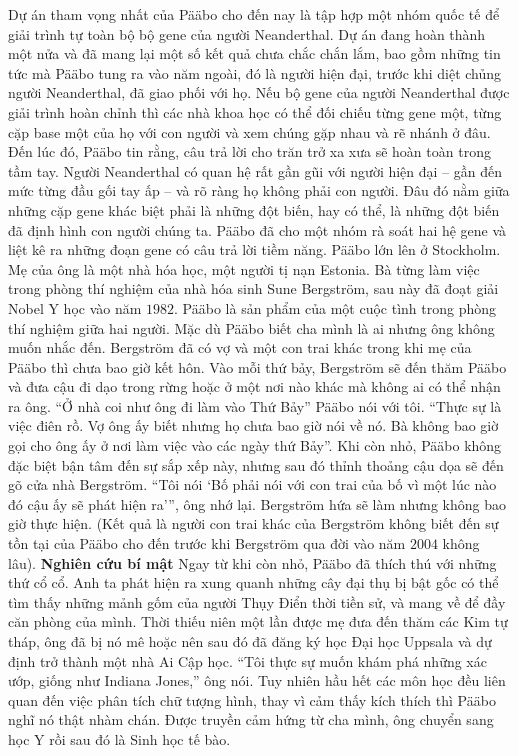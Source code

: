 \begin{multicols}{2}
	\vskip 0.1cm
	Dự án tham vọng nhất của Pääbo cho đến nay là tập hợp một nhóm quốc tế để giải trình tự toàn bộ bộ gene của người Neanderthal. Dự án đang hoàn thành một nửa và đã mang lại một số kết quả chưa chắc chắn lắm, bao gồm những tin tức mà Pääbo tung ra vào năm ngoài, đó là người hiện đại, trước khi diệt chủng người Neanderthal, đã giao phối với họ.
	\vskip 0.1cm
	Nếu bộ gene của người Neanderthal được giải trình hoàn chỉnh thì các nhà khoa học có thể đối chiếu từng gene một, từng cặp base một của họ với con người và xem chúng gặp nhau và rẽ nhánh ở đâu. Đến lúc đó, Pääbo tin rằng, câu trả lời cho trăn trở xa xưa sẽ hoàn toàn trong tầm tay.
	\vskip 0.1cm
	Người Neanderthal có quan hệ rất gần gũi với người hiện đại -- gần đến mức từng đầu gối tay ấp -- và rõ ràng họ không phải con người. Đâu đó nằm giữa những cặp gene khác biệt phải là những đột biến, hay có thể, là những đột biến đã định hình con người chúng ta. Pääbo đã cho một nhóm rà soát hai hệ gene và liệt kê ra những đoạn gene có câu trả lời tiềm năng.
	\vskip 0.1cm
	Pääbo lớn lên ở Stockholm. Mẹ của ông là một nhà hóa học, một người tị nạn Estonia. Bà từng làm việc trong phòng thí nghiệm của nhà hóa sinh Sune Bergström, sau này đã đoạt giải Nobel Y học vào năm $1982$. Pääbo là sản phẩm của một cuộc tình trong phòng thí nghiệm giữa hai người. Mặc dù Pääbo biết cha mình là ai nhưng ông không muốn nhắc đến. Bergström đã có vợ và một con trai khác trong khi mẹ của Pääbo thì chưa bao giờ kết hôn. Vào mỗi thứ bảy, Bergström sẽ đến thăm Pääbo và đưa cậu đi dạo trong rừng hoặc ở một nơi nào khác mà không ai có thể nhận ra ông.
	\vskip 0.1cm
	“Ở nhà coi như ông đi làm vào Thứ Bảy” Pääbo nói với tôi. “Thực sự là việc điên rồ. Vợ ông ấy biết nhưng họ chưa bao giờ nói về nó. Bà không bao giờ gọi cho ông ấy ở nơi làm việc vào các ngày thứ Bảy”. Khi còn nhỏ, Pääbo không đặc biệt bận tâm đến sự sắp xếp này, nhưng sau đó thỉnh thoảng cậu dọa sẽ đến gõ cửa nhà Bergström. “Tôi nói ‘Bố phải nói với con trai của bố vì một lúc nào đó cậu ấy sẽ phát hiện ra’”, ông nhớ lại. Bergström hứa sẽ làm nhưng không bao giờ thực hiện. (Kết quả là người con trai khác của Bergström không biết đến sự tồn tại của Pääbo cho đến trước khi Bergström qua đời vào năm $2004$ không lâu).
	\vskip 0.1cm
	\textbf{\color{timhieukhoahoc}Nghiên cứu bí mật}
	\vskip 0.1cm
	Ngay từ khi còn nhỏ, Pääbo đã thích thú với những thứ cổ cổ. Anh ta phát hiện ra xung quanh những cây đại thụ bị bật gốc có thể tìm thấy những mảnh gốm của người Thụy Điển thời tiền sử, và mang về để đầy căn phòng của mình. Thời thiếu niên một lần được mẹ đưa đến thăm các Kim tự tháp, ông đã bị nó mê hoặc nên sau đó đã đăng ký học Đại học Uppsala và dự định trở thành một nhà Ai Cập học. “Tôi thực sự muốn khám phá những xác ướp, giống như Indiana Jones,” ông nói. Tuy nhiên hầu hết các môn học đều liên quan đến việc phân tích chữ tượng hình, thay vì cảm thấy kích thích thì Pääbo nghĩ nó thật nhàm chán. Được truyền cảm hứng từ cha mình, ông chuyển sang học Y rồi sau đó là Sinh học tế bào.

\end{multicols}
